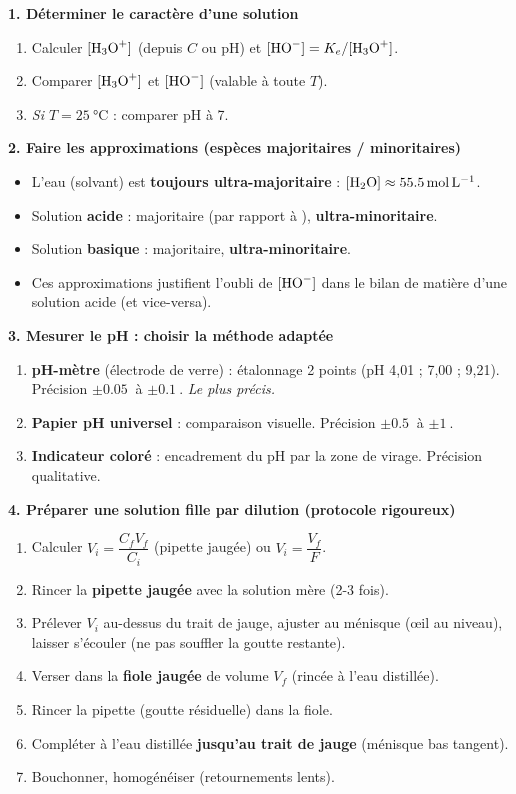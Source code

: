 \documentclass[11pt]{article}
\begin{document}
\begin{methode}
\textbf{1. Déterminer le caractère d'une solution}
\begin{enumerate}
  \item Calculer $[\ce{H3O+}]$ (depuis $C$ ou pH) et $[\ce{HO-}] = K_e/[\ce{H3O+}]$.
  \item Comparer $[\ce{H3O+}]$ et $[\ce{HO-}]$ (valable à toute $T$).
  \item \textit{Si $T=\SI{25}{\celsius}$} : comparer pH à 7.
\end{enumerate}

\textbf{2. Faire les approximations (espèces majoritaires / minoritaires)}
\begin{itemize}
  \item L'eau (solvant) est \textbf{toujours ultra-majoritaire} : $[\ce{H2O}] \approx \SI{55,5}{mol.L^{-1}}$.
  \item Solution \textbf{acide} :  majoritaire (par rapport à ),  \textbf{ultra-minoritaire}.
  \item Solution \textbf{basique} :  majoritaire,  \textbf{ultra-minoritaire}.
  \item Ces approximations justifient l'oubli de $[\ce{HO-}]$ dans le bilan de matière d'une solution acide (et vice-versa).
\end{itemize}

\textbf{3. Mesurer le pH : choisir la méthode adaptée}
\begin{enumerate}
  \item \textbf{pH-mètre} (électrode de verre) : étalonnage 2 points (pH 4,01 ; 7,00 ; 9,21). Précision $\pm \SI{0,05}{}$ à $\pm \SI{0,1}{}$. \emph{Le plus précis.}
  \item \textbf{Papier pH universel} : comparaison visuelle. Précision $\pm \SI{0,5}{}$ à $\pm \SI{1}{}$.
  \item \textbf{Indicateur coloré} : encadrement du pH par la zone de virage. Précision qualitative.
\end{enumerate}

\textbf{4. Préparer une solution fille par dilution (protocole rigoureux)}
\begin{enumerate}
  \item Calculer $V_i = \dfrac{C_f V_f}{C_i}$ (pipette jaugée) ou $V_i = \dfrac{V_f}{F}$.
  \item Rincer la \textbf{pipette jaugée} avec la solution mère (2-3 fois).
  \item Prélever $V_i$ au-dessus du trait de jauge, ajuster au ménisque (œil au niveau), laisser s'écouler (ne pas souffler la goutte restante).
  \item Verser dans la \textbf{fiole jaugée} de volume $V_f$ (rincée à l'eau distillée).
  \item Rincer la pipette (goutte résiduelle) dans la fiole.
  \item Compléter à l'eau distillée \textbf{jusqu'au trait de jauge} (ménisque bas tangent).
  \item Bouchonner, homogénéiser (retournements lents).
\end{enumerate}
\end{methode}
\end{document}
